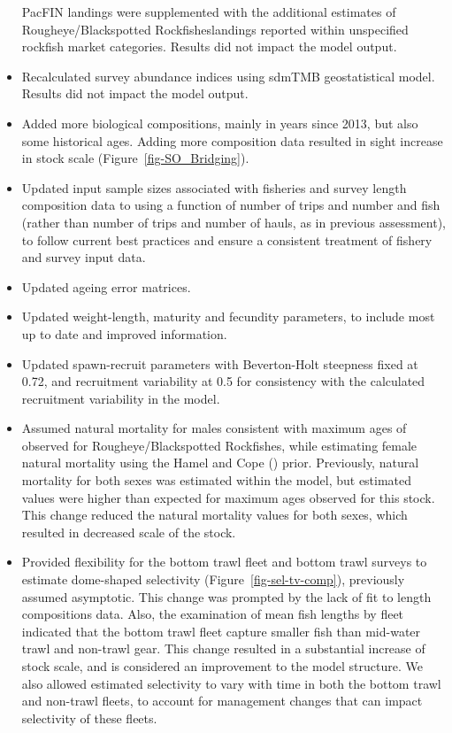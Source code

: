 \documentclass[
]{scrartcl}
\begin{document}
\begin{itemize}
  PacFIN landings were supplemented with the additional estimates of
  Rougheye/Blackspotted Rockfisheslandings reported within unspecified
  rockfish market categories. Results did not impact the model output.
\item
  Recalculated survey abundance indices using sdmTMB geostatistical
  model. Results did not impact the model output.
\item
  Added more biological compositions, mainly in years since 2013, but
  also some historical ages. Adding more composition data resulted in
  sight increase in stock scale (Figure~\ref{fig-SO_Bridging}).
\item
  Updated input sample sizes associated with fisheries and survey length
  composition data to using a function of number of trips and number and
  fish (rather than number of trips and number of hauls, as in previous
  assessment), to follow current best practices and ensure a consistent
  treatment of fishery and survey input data.
\item
  Updated ageing error matrices.
\item
  Updated weight-length, maturity and fecundity parameters, to include
  most up to date and improved information.
\item
  Updated spawn-recruit parameters with Beverton-Holt steepness fixed at
  0.72, and recruitment variability at 0.5 for consistency with the
  calculated recruitment variability in the model.
\item
  Assumed natural mortality for males consistent with maximum ages of
  observed for Rougheye/Blackspotted Rockfishes, while estimating female
  natural mortality using the Hamel and Cope
  () prior. Previously,
  natural mortality for both sexes was estimated within the model, but
  estimated values were higher than expected for maximum ages observed
  for this stock. This change reduced the natural mortality values for
  both sexes, which resulted in decreased scale of the stock.
\item
  Provided flexibility for the bottom trawl fleet and bottom trawl
  surveys to estimate dome-shaped selectivity
  (Figure~\ref{fig-sel-tv-comp}), previously assumed asymptotic. This
  change was prompted by the lack of fit to length compositions data.
  Also, the examination of mean fish lengths by fleet indicated that the
  bottom trawl fleet capture smaller fish than mid-water trawl and
  non-trawl gear. This change resulted in a substantial increase of
  stock scale, and is considered an improvement to the model structure.
  We also allowed estimated selectivity to vary with time in both the
  bottom trawl and non-trawl fleets, to account for management changes
  that can impact selectivity of these fleets.
\end{itemize}
\end{document}

